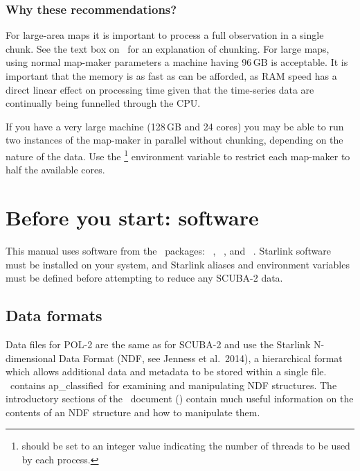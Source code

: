 \subsubsection*{Why these recommendations?}

For large-area maps it is important to process a full observation in a
single chunk. See the text box on
\ for
an explanation of chunking. For large maps, using normal map-maker
parameters a machine having 96\,GB is acceptable. It is important that
the memory is as fast as can be afforded, as RAM speed has a direct
linear effect on processing time given that the time-series data are
continually being funnelled through the CPU.

If you have a very large machine (128\,GB and 24 cores) you may be able
to run two instances of the map-maker in parallel without chunking,
depending on the nature of the data. Use
the \footnote{ should be
set to an integer value indicating the number of threads to be used by
each process.} environment variable to restrict each map-maker to half
the available cores.

\section{Before you start: software}

This manual uses software from the \starlink\ packages: \smurf\
\cite{smurf}, \Kappa\ \cite{kappa}, and \gaia\ \cite{gaia}. 
Starlink software must be installed on your system, and Starlink 
aliases and environment variables must be defined before attempting 
to reduce any SCUBA-2 data.

\subsection{Data formats}
\label{sec:ndf}

Data files for POL-2 are the same as for SCUBA-2 and use 
the Starlink N-dimensional Data Format (NDF,
see Jenness et al.\ 2014\cite{ndf}), a hierarchical format which allows
additional data and metadata to be stored within a single file. \Kappa\
contains  {ap_classified}\ for examining and
manipulating NDF structures. The introductory sections of the \Kappa\
document () contain much useful information on
the contents of an NDF structure and how to manipulate them.

